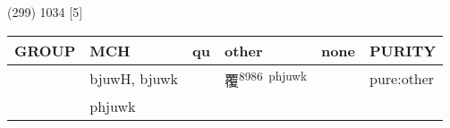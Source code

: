 \documentclass[14pt,a4paper]{scrartcl}
\begin{document}
(299) 1034 {[}5{]}

\begin{longtable}[c]{@{}llllll@{}}
\toprule
\begin{minipage}[b]{0.14\columnwidth}\raggedright\strut
GROUP
\strut\end{minipage} &
\begin{minipage}[b]{0.14\columnwidth}\raggedright\strut
MCH
\strut\end{minipage} &
\begin{minipage}[b]{0.14\columnwidth}\raggedright\strut
qu
\strut\end{minipage} &
\begin{minipage}[b]{0.14\columnwidth}\raggedright\strut
other
\strut\end{minipage} &
\begin{minipage}[b]{0.14\columnwidth}\raggedright\strut
none
\strut\end{minipage} &
\begin{minipage}[b]{0.14\columnwidth}\raggedright\strut
PURITY
\strut\end{minipage}\tabularnewline
\midrule
\endhead
\begin{minipage}[t]{0.14\columnwidth}\raggedright\strut
𢕒
\strut\end{minipage} &
\begin{minipage}[t]{0.14\columnwidth}\raggedright\strut
bjuwH, bjuwk
\strut\end{minipage} &
\begin{minipage}[t]{0.14\columnwidth}\raggedright\strut
\strut\end{minipage} &
\begin{minipage}[t]{0.14\columnwidth}\raggedright\strut
覆\textsuperscript{8986~phjuwk}
\strut\end{minipage} &
\begin{minipage}[t]{0.14\columnwidth}\raggedright\strut
\strut\end{minipage} &
\begin{minipage}[t]{0.14\columnwidth}\raggedright\strut
pure:other
\strut\end{minipage}\tabularnewline
\begin{minipage}[t]{0.14\columnwidth}\raggedright\strut
𡕨
\strut\end{minipage} &
\begin{minipage}[t]{0.14\columnwidth}\raggedright\strut
phjuwk
\strut\end{minipage} &
\begin{minipage}[t]{0.14\columnwidth}\raggedright\strut

\end{minipage}
\end{longtable}
\end{document}
